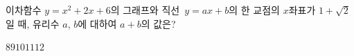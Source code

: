 이차함수 $y=x^2+2x+6$의 그래프와 직선~$y=ax+b$의 한 교점의 $x$좌표가 $1+\sqrt{2}$일 때, 유리수 $a$, $b$에 대하여 $a+b$의 값은?
\begin{choices32}{$8$}{$9$}{$10$}{$11$}{$12$}\end{choices32}
